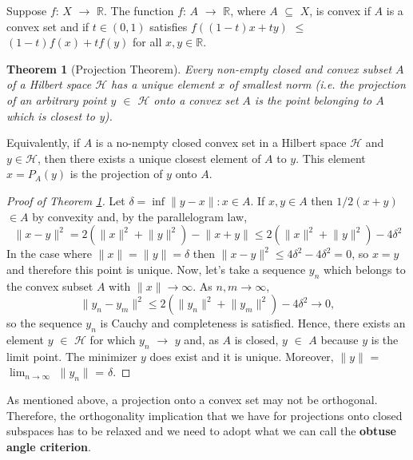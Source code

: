 \documentclass{article}
\newtheorem{thm}{Theorem}
\begin{document}
Suppose $f$: $X$ $\rightarrow$ $\mathbb R$. The function $f$: $A$ $\rightarrow$ $\mathbb R$, where $A$ $\subseteq$ $X$, is convex if $A$ is a convex set and if $t \in (0,1)$ satisfies $f((1-t)x + ty)$ $\leqslant$ $(1-t)f(x) + tf(y)$ for all $x,y \in \mathbb R$.\newline

\begin{thm}[Projection Theorem]\label{thm:cvx}
Every non-empty closed and convex subset $A$ of a Hilbert space $\mathscr{H}$ has a unique element $x$ of smallest norm (i.e. the projection of an arbitrary point $y$ $\in$ $\mathscr{H}$ onto a convex set $A$ is the point belonging to $A$ which is closest to y). 
\end{thm}
Equivalently, if $A$ is a no-nempty closed convex set in a Hilbert space $\mathscr{H}$ and $y \in \mathscr{H}$, then there exists a unique closest element of $A$ to $y$. This element $x = P_A(y)$ is the projection of $y$ onto $A$. 

\begin{proof}[Proof of Theorem \ref{thm:cvx}]
Let $\delta = \inf {\lVert y - x \rVert : x \in A}$. If $x, y \in A$ then $1/2$$(x + y)$ $\in A$ by convexity and, by the parallelogram law, 
\[
\lVert x - y\rVert^2 = 2(\lVert x \rVert^2 + \lVert y \rVert^2) - \lVert x + y\rVert \leqslant 2(\lVert x \rVert^2 + \lVert y \rVert^2) - 4\delta^2
\]
In the case where $\lVert x \rVert = \lVert y \rVert = \delta$ then $\lVert x - y\rVert^2 \leqslant 4\delta^2 - 4\delta^2 = 0$, so $x = y$ and therefore this point is unique. 
Now, let's take a sequence ${y_n}$ which belongs to the convex subset $A$ with $\lVert x \rVert \rightarrow \infty$. As $n, m \rightarrow \infty$,
\[
\lVert y_n - y_m \rVert^2 \leqslant 2(\lVert y_n\rVert^2 + \lVert y_m\rVert^2) - 4\delta^2 \rightarrow 0,
\]
so the sequence ${y_n}$ is Cauchy and completeness is satisfied. Hence, there exists an element $y$ $\in$ $\mathscr{H}$ for which $y_n$ $\rightarrow$ $y$ and, as $A$ is closed, $y$ $\in$ $A$ because $y$ is the limit point. The minimizer $y$ does exist and it is unique. Moreover, $\lVert y\rVert$ = $\lim_{n \rightarrow \infty}$ $\lVert y_n \rVert$ = $\delta$. \newline
\end{proof}

As mentioned above, a projection onto a convex set may not be orthogonal. Therefore, the orthogonality implication that we have for projections onto closed subspaces has to be relaxed and we need to adopt what we can call the \textbf{obtuse angle criterion}. \newline
\end{document}
